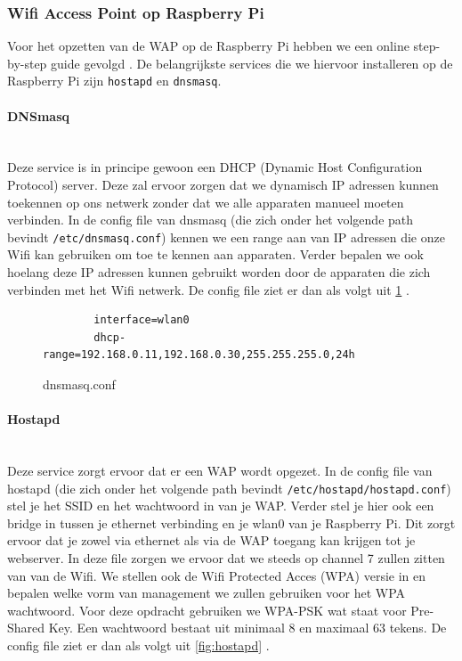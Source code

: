 \documentclass[a4paper,kul]{kulakarticle} %
\begin{document}
\subsubsection{Wifi Access Point op Raspberry Pi}
Voor het opzetten van de WAP op de Raspberry Pi hebben we een online step-by-step guide gevolgd \cite{RaspberryPiWAP}. De belangrijkste services die we hiervoor installeren op de Raspberry Pi zijn \verb|hostapd| en \verb|dnsmasq|.
\paragraph{DNSmasq} \mbox{}\\ 
Deze service is in principe gewoon een DHCP (Dynamic Host Configuration Protocol) server. Deze zal ervoor zorgen dat we dynamisch IP adressen kunnen toekennen op ons netwerk zonder dat we alle apparaten manueel moeten verbinden. In de config file van dnsmasq (die zich onder het volgende path bevindt \verb|/etc/dnsmasq.conf|) kennen we een range aan van IP adressen die onze Wifi kan gebruiken om toe te kennen aan apparaten. Verder bepalen we ook hoelang deze IP adressen kunnen gebruikt worden door de apparaten die zich verbinden met het Wifi netwerk. De config file ziet er dan als volgt uit \ref{fig:dnsmasq} .

\begin{figure}[!h]
	\begin{verbatim}
		interface=wlan0
		dhcp-range=192.168.0.11,192.168.0.30,255.255.255.0,24h
	\end{verbatim}
	\caption{dnsmasq.conf}
	\label{fig:dnsmasq}
\end{figure}
\paragraph{Hostapd} \mbox{}\\
Deze service zorgt ervoor dat er een WAP wordt opgezet. In de config file van hostapd (die zich onder het volgende path bevindt \verb|/etc/hostapd/hostapd.conf|) stel je het SSID en het wachtwoord in van je WAP. Verder stel je hier ook een bridge in tussen je ethernet verbinding en je wlan0 van je Raspberry Pi. Dit zorgt ervoor dat je zowel via ethernet als via de WAP toegang kan krijgen tot je webserver. In deze file zorgen we ervoor dat we steeds op channel 7 zullen zitten van van de Wifi. We stellen ook de Wifi Protected Acces (WPA) versie in en bepalen welke vorm van management we zullen gebruiken voor het WPA wachtwoord. Voor deze opdracht gebruiken we WPA-PSK wat staat voor Pre-Shared Key. Een wachtwoord bestaat uit minimaal 8 en maximaal 63 tekens. De config file ziet er dan als volgt uit \ref{fig:hostapd} .
\end{document}
